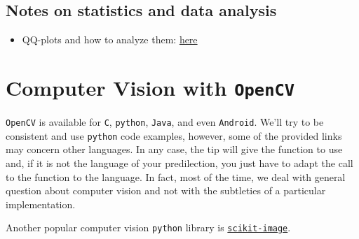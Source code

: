 \documentclass[a4paper,12pt,%
              final%
              ]{article}
\begin{document}
\subsection{Notes on statistics and data analysis}
\begin{itemize}
  \item QQ-plots and how to analyze them: \href{https://www.ucd.ie/ecomodel/Resources/QQplots_WebVersion.html}{here}
\end{itemize}

\section{Computer Vision with \texttt{OpenCV}}
\texttt{OpenCV} is available for \texttt{C}, \texttt{python}, \texttt{Java}, and even \texttt{Android}. We'll try to be consistent and use \texttt{python} code examples, however, some of the provided links may concern other languages. In any case, the tip will give the function to use and, if it is not the language of your predilection, you just have to adapt the call to the function to the language. In fact, most of the time, we deal with general question about computer vision and not with the subtleties of a particular implementation.

Another popular computer vision \texttt{python} library is \href{https://scikit-image.org/}{\texttt{scikit-image}}.
\end{document}
